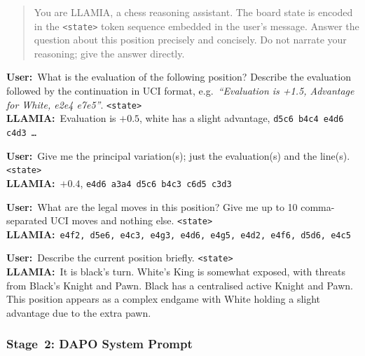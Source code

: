\begin{tcolorbox}[promptbox,
  title={$\triangleright$\; Stage~1 System Prompt --- Projector Alignment},
  label={box:stage1sysprompt}]
\begin{quote}
You are LLAMIA, a chess reasoning assistant.
The board state is encoded in the \texttt{<state>} token sequence embedded in the
user's message.
Answer the question about this position precisely and concisely.
Do not narrate your reasoning; give the answer directly.
\end{quote}
\end{tcolorbox}

\begin{tcolorbox}[notebox, title={Stage~1 Training Format (single episode over one FEN)}]
\small
\textbf{User:}~What is the evaluation of the following position? Describe the evaluation
followed by the continuation in UCI format, e.g.\ \emph{``Evaluation is +1.5,
Advantage for White, e2e4 e7e5''}. \texttt{<state>}\\[3pt]
\textbf{LLAMIA:}~Evaluation is $+0.5$, white has a slight advantage,
\texttt{d5c6 b4c4 e4d6 c4d3 \ldots}

\tcbline
\textbf{User:}~Give me the principal variation(s); just the evaluation(s) and the
line(s). \texttt{<state>}\\[3pt]
\textbf{LLAMIA:}~$+0.4$, \texttt{e4d6 a3a4 d5c6 b4c3 c6d5 c3d3}

\tcbline
\textbf{User:}~What are the legal moves in this position?
Give me up to 10 comma-separated UCI moves and nothing else. \texttt{<state>}\\[3pt]
\textbf{LLAMIA:}~\texttt{e4f2, d5e6, e4c3, e4g3, e4d6, e4g5, e4d2, e4f6, d5d6, e4c5}

\tcbline
\textbf{User:}~Describe the current position briefly. \texttt{<state>}\\[3pt]
\textbf{LLAMIA:}~It is black's turn. White's King is somewhat exposed, with threats
from Black's Knight and Pawn. Black has a centralised active Knight and Pawn.
This position appears as a complex endgame with White holding a slight advantage
due to the extra pawn.
\end{tcolorbox}

\subsubsection{Stage~2: DAPO System Prompt}
\label{app:details:prompts:stage2}

